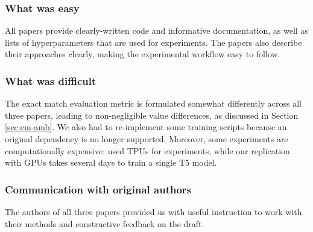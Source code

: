 \subsubsection*{What was easy}
All papers provide clearly-written code and informative documentation, as well as lists of hyperparameters that are used for experiments.
The papers also describe their approaches clearly, making the experimental workflow easy to follow.

\subsubsection*{What was difficult}

The exact match evaluation metric is formulated somewhat differently across all three papers, leading to non-negligible value differences, as discussed in Section \ref{sec:em-amb}.
We also had to re-implement some training scripts because an original dependency is no longer supported.
Moreover, some experiments are computationally expensive: \cite{shaw-etal-2021-compositional} used TPUs for experiments, while our replication with GPUs takes several days to train a single T5 model.

\subsubsection*{Communication with original authors}
The authors of all three papers provided us with useful instruction to work with their methods and constructive feedback on the draft.